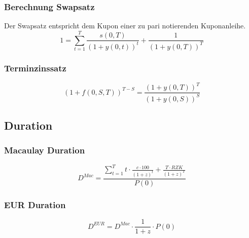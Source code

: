 \subsubsection{Berechnung Swapsatz}
Der Swapsatz entspricht dem Kupon einer zu pari notierenden Kuponanleihe.
\[1 = \sum_{t=1}^{T} \frac{s(0,T)}{(1+y(0,t))^t} + \frac{1}{(1+y(0,T))^T}\]

\subsubsection{Terminzinssatz}
\[(1+f(0,S,T))^{T-S} = \frac{(1+y(0,T))^T}{(1+y(0,S))^S}\]


\subsection{Duration}

\subsubsection{Macaulay Duration}
\[D^{Mac} = \frac{\sum_{t=1}^{T} t \cdot \frac{c \cdot 100}{(1+z)^t} + \frac{T \cdot RZK}{(1+z)^T}}{P(0)} \]

\subsubsection{EUR Duration}
\[D^{EUR} = D^{Mac} \cdot \frac{1}{1+z} \cdot P(0) \]

